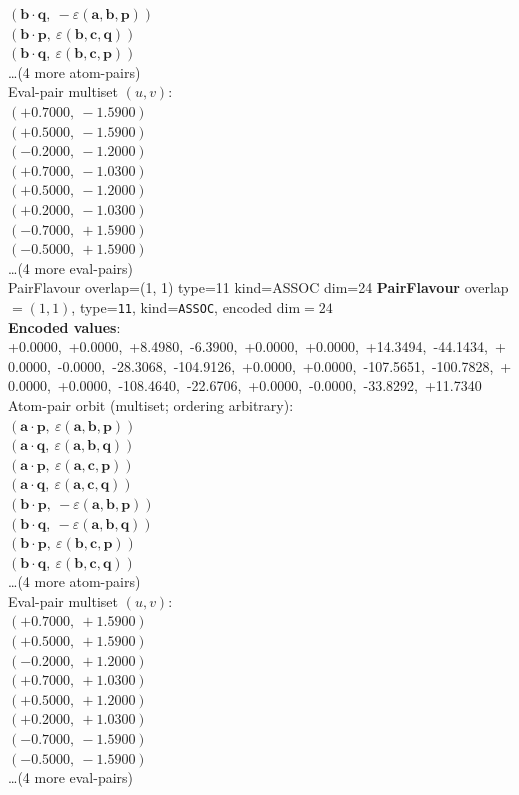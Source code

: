 \documentclass[a4paper,11pt]{article}
\newcommand{\pdcegfomjfhook}[2]{\mathbf{#1} \cdot \mathbf{#2}}
\newcommand{\kblbmcpggoncpf}[3]{\varepsilon(\mathbf{#1},\mathbf{#2},\mathbf{#3})}
\begin{document}
$(\pdcegfomjfhook{b}{q},\ -\kblbmcpggoncpf{a}{b}{p})$\\
$(\pdcegfomjfhook{b}{p},\ \kblbmcpggoncpf{b}{c}{q})$\\
$(\pdcegfomjfhook{b}{q},\ \kblbmcpggoncpf{b}{c}{p})$\\
\quad \ldots (4 more atom-pairs)\\
\quad Eval-pair multiset $(u, v)$:\\
$(+0.7000,\ -1.5900)$\\
$(+0.5000,\ -1.5900)$\\
$(-0.2000,\ -1.2000)$\\
$(+0.7000,\ -1.0300)$\\
$(+0.5000,\ -1.2000)$\\
$(+0.2000,\ -1.0300)$\\
$(-0.7000,\ +1.5900)$\\
$(-0.5000,\ +1.5900)$\\
\quad \ldots (4 more eval-pairs)\\
    PairFlavour  overlap=(1, 1)  type=11  kind=ASSOC  dim=24
\textbf{PairFlavour} overlap$=(1, 1)$, type=\texttt{11}, kind=\texttt{ASSOC}, encoded dim$=24$\\
\textbf{      Encoded values}: +0.0000,\ +0.0000,\ +8.4980,\ -6.3900,\ +0.0000,\ +0.0000,\ +14.3494,\ -44.1434,\ +0.0000,\ -0.0000,\ -28.3068,\ -104.9126,\ +0.0000,\ +0.0000,\ -107.5651,\ -100.7828,\ +0.0000,\ +0.0000,\ -108.4640,\ -22.6706,\ +0.0000,\ -0.0000,\ -33.8292,\ +11.7340\\
\quad Atom-pair orbit (multiset; ordering arbitrary):\\
$(\pdcegfomjfhook{a}{p},\ \kblbmcpggoncpf{a}{b}{p})$\\
$(\pdcegfomjfhook{a}{q},\ \kblbmcpggoncpf{a}{b}{q})$\\
$(\pdcegfomjfhook{a}{p},\ \kblbmcpggoncpf{a}{c}{p})$\\
$(\pdcegfomjfhook{a}{q},\ \kblbmcpggoncpf{a}{c}{q})$\\
$(\pdcegfomjfhook{b}{p},\ -\kblbmcpggoncpf{a}{b}{p})$\\
$(\pdcegfomjfhook{b}{q},\ -\kblbmcpggoncpf{a}{b}{q})$\\
$(\pdcegfomjfhook{b}{p},\ \kblbmcpggoncpf{b}{c}{p})$\\
$(\pdcegfomjfhook{b}{q},\ \kblbmcpggoncpf{b}{c}{q})$\\
\quad \ldots (4 more atom-pairs)\\
\quad Eval-pair multiset $(u, v)$:\\
$(+0.7000,\ +1.5900)$\\
$(+0.5000,\ +1.5900)$\\
$(-0.2000,\ +1.2000)$\\
$(+0.7000,\ +1.0300)$\\
$(+0.5000,\ +1.2000)$\\
$(+0.2000,\ +1.0300)$\\
$(-0.7000,\ -1.5900)$\\
$(-0.5000,\ -1.5900)$\\
\quad \ldots (4 more eval-pairs)\\
\end{document}
